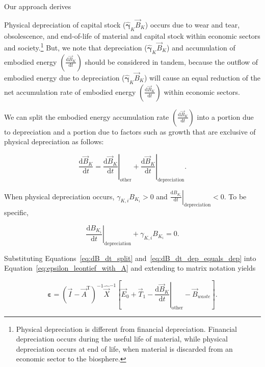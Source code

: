 Our approach derives




Physical depreciation 
of capital stock ($\hat{\bm{\gamma}}_{K}\vec{B}_{K}$)
occurs due to wear and tear, obsolescence, and end-of-life
of material and capital stock 
within economic sectors and society.\footnote{Physical depreciation
is different from financial depreciation. 
Financial depreciation occurs during the useful life of material, 
while physical depreciation occurs at end of life, 
when material is discarded from an economic sector to the biosphere.}
But, we note that depreciation ($\hat{\bm{\gamma}}_{K} \vec{B}_{K}$) 
and accumulation of embodied energy 
$\left( \frac{\mathrm{d}\vec{B}_{K}}{\mathrm{d}t} \right)$
should be considered in tandem,
because the outflow of embodied energy due to depreciation
($\hat{\bm{\gamma}}_{K} \vec{B}_{K}$)
will cause an equal reduction of the net accumulation rate of embodied energy
$\left( \frac{\mathrm{d}\vec{B}_{K}}{\mathrm{d}t} \right)$
within economic sectors.

We can split the embodied energy accumulation rate 
$\left( \frac{\mathrm{d}\vec{B}_{K}}{\mathrm{d}t} \right)$
into a portion due to depreciation and a portion due to 
factors such as growth that are exclusive of physical depreciation as follows:

\begin{equation} \label{eq:dB_dt_split}
	\frac{\mathrm{d}\vec{B}_{K}}{\mathrm{d}t} 
	= \left. \frac{\mathrm{d}\vec{B}_{K}}{\mathrm{d}t} \right|_{\mathrm{other}} 
	+ \left. \frac{\mathrm{d}\vec{B}_{K}}{\mathrm{d}t} \right|_{\mathrm{depreciation}}.
\end{equation}

\noindent{}When physical depreciation occurs,
$\gamma_{K,i} B_{K_{i}} > 0$ and 
$\left. \frac{\mathrm{d}B_{K_{i}}}{\mathrm{d}t} \right|_{\mathrm{depreciation}} < 0$.
To be specific,

\begin{equation} \label{eq:dB_dt_dep_equals_dep}
	\left. \frac{\mathrm{d}B_{K_{i}}}{\mathrm{d}t} \right|_{\mathrm{depreciation}} 
	+ \gamma_{K,i} B_{K_{i}}
	= 0.
\end{equation}

\noindent{}Substituting Equations~\ref{eq:dB_dt_split} and~\ref{eq:dB_dt_dep_equals_dep}
into Equation~\ref{eq:epsilon_leontief_with_A} and extending to matrix notation yields

\begin{equation} \label{eq:epsilon_leontief_depreciation_simplification}
	\bm{\varepsilon} 
	= {(\vec{I} - \vec{A}^{\mathrm{T}})}^{-1}\hat{\vec{X}}^{-1}
		\left[\vec{E}_{0} 
				+ \vec{T}_{1} 
				- \left. \frac{\mathrm{d}\vec{B}_{K}}{\mathrm{d}t} \right|_{\mathrm{other}}
				- \vec{B}_{waste}
		\right].
\end{equation}


